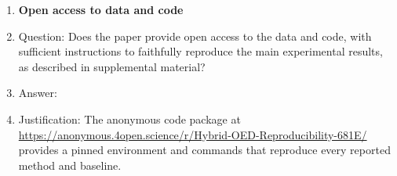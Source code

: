 \begin{enumerate}
\item {\bf Open access to data and code}
    \item[] Question: Does the paper provide open access to the data and code, with sufficient instructions to faithfully reproduce the main experimental results, as described in supplemental material?
    \item[] Answer: \answerYes{}
    \item[] Justification: The anonymous code package at
    \url{https://anonymous.4open.science/r/Hybrid-OED-Reproducibility-681E/}
    provides a pinned environment and commands that reproduce every reported
    method and baseline.



\end{enumerate}
